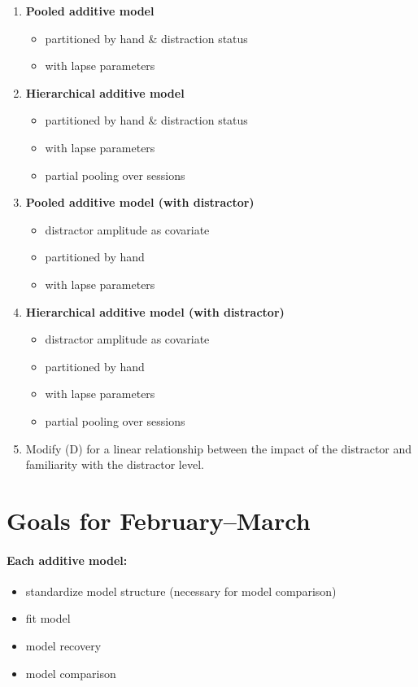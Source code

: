 \documentclass[11pt]{article}
\begin{document}
\begin{enumerate}[label=\Alph*)]
  \item \textbf{Pooled additive model}
  \begin{itemize}[nosep]
    \item partitioned by hand \& distraction status
    \item with lapse parameters
  \end{itemize}
  \item \textbf{Hierarchical additive model}
  \begin{itemize}[nosep]
    \item partitioned by hand \& distraction status
    \item with lapse parameters
    \item partial pooling over sessions
  \end{itemize}
  \item \textbf{Pooled additive model (with distractor)}
  \begin{itemize}[nosep]
    \item distractor amplitude as covariate
    \item partitioned by hand
    \item with lapse parameters
  \end{itemize}
  \item \textbf{Hierarchical additive model (with distractor)}
  \begin{itemize}[nosep]
    \item distractor amplitude as covariate
    \item partitioned by hand
    \item with lapse parameters
    \item partial pooling over sessions
  \end{itemize}
  \item Modify (D) for a linear relationship between the impact of the distractor and
  familiarity with the distractor level.
\end{enumerate}

\section{Goals for February--March}

\paragraph{Each additive model:}
\begin{itemize}[nosep]
  \item standardize model structure (necessary for model comparison)
  \item fit model
  \item model recovery
  \item model comparison
\end{itemize}
\end{document}
